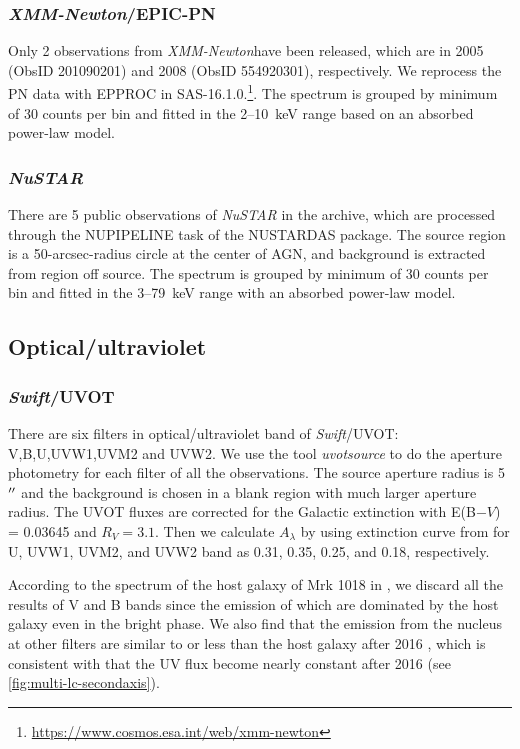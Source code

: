 \documentclass[twocolumn]{aastex63}
\newcommand{\xmm}{{\em XMM-Newton}}
\newcommand{\nustar}{{\em NuSTAR }}
\newcommand{\swift}{{\em Swift}}
\begin{document}
\subsubsection{\xmm/EPIC-PN}
Only 2 observations from \xmm have been released, which are in 2005 (ObsID 201090201) and 2008 (ObsID 554920301), respectively. We reprocess the PN data with {\scriptsize EPPROC} in SAS-16.1.0.\footnote{\url{https://www.cosmos.esa.int/web/xmm-newton}}. The spectrum is grouped by minimum of 30 counts per bin and fitted in the 2--10~keV range based on an absorbed power-law model. 



\subsubsection{\nustar}
There are 5 public observations of \nustar in the archive, which are processed through the {\scriptsize NUPIPELINE} task of the {\scriptsize NUSTARDAS} package. The source region is a 50-arcsec-radius circle at the center of AGN, and background is extracted from region off source. The spectrum is grouped by minimum of 30 counts per bin and fitted in the 3--79~keV range with an absorbed power-law model.


\subsection{Optical/ultraviolet}
\subsubsection{\swift/UVOT}
There are six filters in optical/ultraviolet band of \swift/UVOT: V,B,U,UVW1,UVM2 and UVW2. We use the tool \textit{uvotsource} to do the aperture photometry for each filter of all the observations. The source aperture radius is 5$\mbox{$^{\prime\prime}$}$ and the background is chosen in a blank region with much larger aperture radius. The UVOT fluxes are corrected for the Galactic extinction with \texorpdfstring{E(B$-V$) = 0.03645} \citet{2018MNRAS.480.3898N} and $R_{V}=3.1$. Then we calculate  $A_{\lambda}$ by using extinction curve from \citet{2007ApJ...663..320F} for U, UVW1, UVM2, and 
UVW2 band as 0.31, 0.35, 0.25, and 0.18, respectively. 

According to the spectrum of the host galaxy of Mrk 1018 in \citep{2018MNRAS.480.3898N}, we discard all the results of V and B bands since the emission of which are dominated by the host galaxy even in the bright phase. We also find that the emission from the nucleus at other filters are similar to or less than the host galaxy after 2016 \citep{2018MNRAS.480.3898N}, which is consistent with that the UV flux become nearly constant after 2016 (see \autoref{fig:multi-lc-secondaxis}). 
\end{document}
